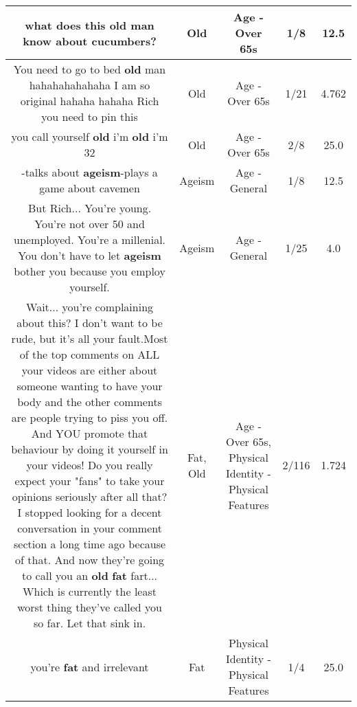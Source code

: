 \documentclass[11pt]{article}
\newlength\mylength
\begin{document}
\begin{center}
\begin{longtable}{|C{.65\mylength}|C{.30\mylength}|C{.12\mylength}|C{.12\mylength}|C{.12\mylength}|}
  \small what does this \textbf{old} man know about cucumbers?\normalsize   & Old & Age - Over 65s & 1/8 & 12.5 \\  \hline
  \small You need to go to bed \textbf{old} man hahahahahahaha I am so original hahaha hahaha Rich you need to pin this\normalsize   & Old & Age - Over 65s & 1/21 & 4.762 \\  \hline
  \small you call yourself \textbf{old} i'm \textbf{old} i'm 32\normalsize   & Old & Age - Over 65s & 2/8 & 25.0 \\  \hline
  \small -talks about \textbf{ageism}-plays a game about cavemen\normalsize   & Ageism & Age - General & 1/8 & 12.5 \\  \hline
  \small But Rich... You're young. You're not over 50 and unemployed. You're a millenial. You don't have to let \textbf{ageism} bother you because you employ yourself.\normalsize   & Ageism & Age - General & 1/25 & 4.0 \\  \hline
  \small Wait... you're complaining about this? I don't want to be rude, but it's all your fault.Most of the top comments on ALL your videos are either about someone wanting to have your body and the other comments are people trying to piss you off. And YOU  promote that behaviour by doing it yourself in your videos!   Do you really expect your "fans" to take your opinions seriously after all that? I stopped looking for a decent conversation in your comment section a long time ago because of that. And now they're going to call you an \textbf{old} \textbf{fat} fart... Which is currently the least worst thing they've called you so far. Let that sink in.\normalsize   & Fat, Old & Age - Over 65s, Physical Identity - Physical Features & 2/116 & 1.724 \\  \hline
  \small you're \textbf{fat} and irrelevant\normalsize   & Fat & Physical Identity - Physical Features & 1/4 & 25.0 \\  \hline

\end{longtable}
\end{center}
\end{document}
